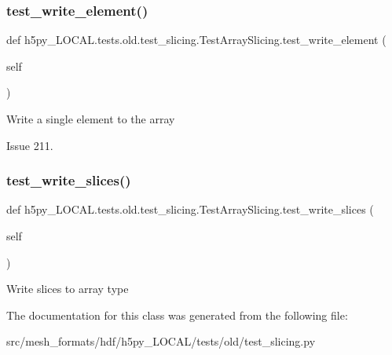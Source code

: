 \subsubsection{\texorpdfstring{test\+\_\+write\+\_\+element()}{test\_write\_element()}}
{\footnotesize\ttfamily def h5py\+\_\+\+L\+O\+C\+A\+L.\+tests.\+old.\+test\+\_\+slicing.\+Test\+Array\+Slicing.\+test\+\_\+write\+\_\+element (\begin{DoxyParamCaption}\item[{}]{self }\end{DoxyParamCaption})}

\begin{DoxyVerb}Write a single element to the array

Issue 211.
\end{DoxyVerb}
 \mbox{\label{classh5py__LOCAL_1_1tests_1_1old_1_1test__slicing_1_1TestArraySlicing_a2a27429ec792371f42e1a81eecd72018}} 
\subsubsection{\texorpdfstring{test\+\_\+write\+\_\+slices()}{test\_write\_slices()}}
{\footnotesize\ttfamily def h5py\+\_\+\+L\+O\+C\+A\+L.\+tests.\+old.\+test\+\_\+slicing.\+Test\+Array\+Slicing.\+test\+\_\+write\+\_\+slices (\begin{DoxyParamCaption}\item[{}]{self }\end{DoxyParamCaption})}

\begin{DoxyVerb}Write slices to array type \end{DoxyVerb}
 

The documentation for this class was generated from the following file\+:\begin{DoxyCompactItemize}
\item 
src/mesh\+\_\+formats/hdf/h5py\+\_\+\+L\+O\+C\+A\+L/tests/old/test\+\_\+slicing.\+py\end{DoxyCompactItemize}
